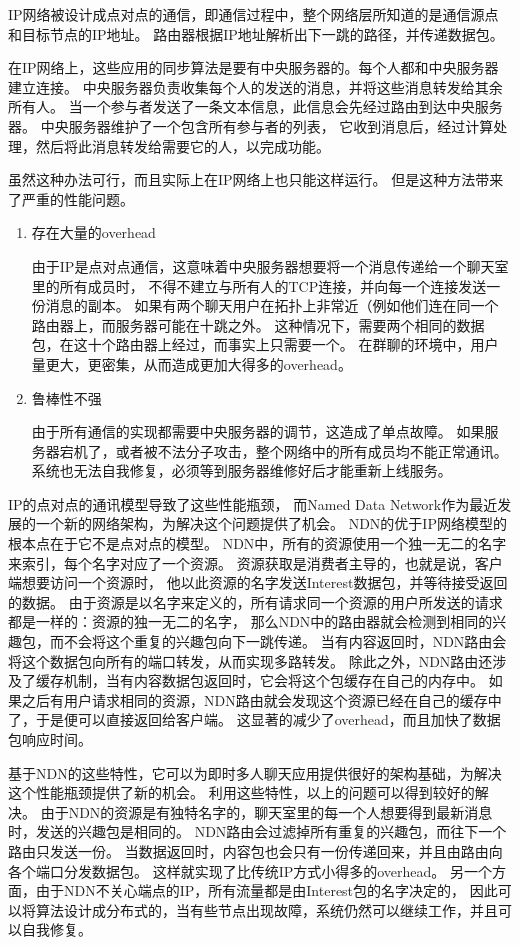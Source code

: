 IP网络被设计成点对点的通信，即通信过程中，整个网络层所知道的是通信源点和目标节点的IP地址。
路由器根据IP地址解析出下一跳的路径，并传递数据包。

在IP网络上，这些应用的同步算法是要有中央服务器的。每个人都和中央服务器建立连接。
中央服务器负责收集每个人的发送的消息，并将这些消息转发给其余所有人。
当一个参与者发送了一条文本信息，此信息会先经过路由到达中央服务器。
中央服务器维护了一个包含所有参与者的列表，
它收到消息后，经过计算处理，然后将此消息转发给需要它的人，以完成功能。

虽然这种办法可行，而且实际上在IP网络上也只能这样运行。
但是这种方法带来了严重的性能问题。

\begin{enumerate}
\item 存在大量的overhead

由于IP是点对点通信，这意味着中央服务器想要将一个消息传递给一个聊天室里的所有成员时，
不得不建立与所有人的TCP连接，并向每一个连接发送一份消息的副本。
如果有两个聊天用户在拓扑上非常近（例如他们连在同一个路由器上，而服务器可能在十跳之外。
这种情况下，需要两个相同的数据包，在这十个路由器上经过，而事实上只需要一个。
在群聊的环境中，用户量更大，更密集，从而造成更加大得多的overhead。
\item 鲁棒性不强

由于所有通信的实现都需要中央服务器的调节，这造成了单点故障。
如果服务器宕机了，或者被不法分子攻击，整个网络中的所有成员均不能正常通讯。
系统也无法自我修复，必须等到服务器维修好后才能重新上线服务。
\end{enumerate}


IP的点对点的通讯模型导致了这些性能瓶颈，
而Named Data Network作为最近发展的一个新的网络架构，为解决这个问题提供了机会。
NDN的优于IP网络模型的根本点在于它不是点对点的模型。
NDN中，所有的资源使用一个独一无二的名字来索引，每个名字对应了一个资源。
资源获取是消费者主导的，也就是说，客户端想要访问一个资源时，
他以此资源的名字发送Interest数据包，并等待接受返回的数据。
由于资源是以名字来定义的，所有请求同一个资源的用户所发送的请求都是一样的：资源的独一无二的名字，
那么NDN中的路由器就会检测到相同的兴趣包，而不会将这个重复的兴趣包向下一跳传递。
当有内容返回时，NDN路由会将这个数据包向所有的端口转发，从而实现多路转发。
除此之外，NDN路由还涉及了缓存机制，当有内容数据包返回时，它会将这个包缓存在自己的内存中。
如果之后有用户请求相同的资源，NDN路由就会发现这个资源已经在自己的缓存中了，于是便可以直接返回给客户端。
这显著的减少了overhead，而且加快了数据包响应时间。

基于NDN的这些特性，它可以为即时多人聊天应用提供很好的架构基础，为解决这个性能瓶颈提供了新的机会。
利用这些特性，以上的问题可以得到较好的解决。
由于NDN的资源是有独特名字的，聊天室里的每一个人想要得到最新消息时，发送的兴趣包是相同的。
NDN路由会过滤掉所有重复的兴趣包，而往下一个路由只发送一份。
当数据返回时，内容包也会只有一份传递回来，并且由路由向各个端口分发数据包。
这样就实现了比传统IP方式小得多的overhead。
另一个方面，由于NDN不关心端点的IP，所有流量都是由Interest包的名字决定的，
因此可以将算法设计成分布式的，当有些节点出现故障，系统仍然可以继续工作，并且可以自我修复。

